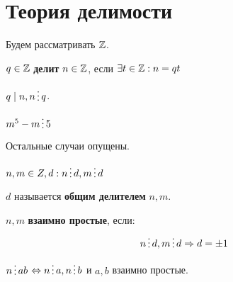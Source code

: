 

\cfoot{}



\section*{Теория делимости}

Будем рассматривать \(\mathbb{Z}\).

\begin{definition}
    \(q \in \mathbb{Z}\) \textbf{делит} \(n \in \mathbb{Z}\), если \(\exists t \in \mathbb{Z} : n = qt\)
\end{definition}
\begin{notation}
    \(q \mid n, n \divided q\).
\end{notation}

\begin{example}
    \(m^5 - m \divided 5\)
\end{example}
\begin{solution}
    \begin{caseof}
    \end{caseof}
    Остальные случаи опущены.
\end{solution}
\begin{definition}
    \(n, m \in Z, d : n \divided d, m \divided d\)

    \(d\) называется \textbf{общим делителем} \(n, m\).
\end{definition}
\begin{definition}
    \(n, m\) \textbf{взаимно простые}, если:
    \[n \divided d, m \divided d \Rightarrow d = \pm 1\]
\end{definition}
\begin{theorem}
    \(n \divided ab\) \(\Leftrightarrow n \divided a, n \divided b\) и \(a, b\) взаимно простые.
\end{theorem}

